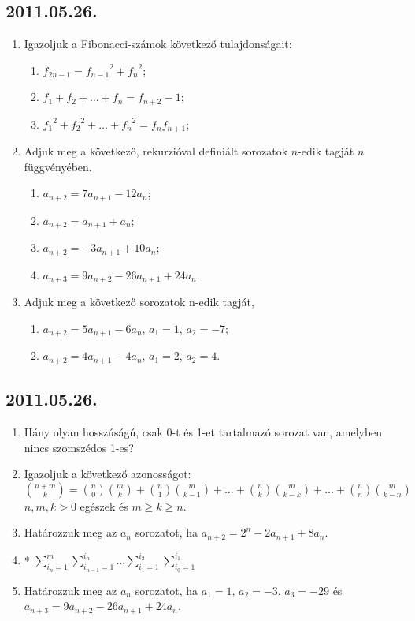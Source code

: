 \documentclass{article}
\begin{document}
\subsection*{2011.05.26.}
\begin{enumerate}
\item Igazoljuk a Fibonacci-számok következő tulajdonságait:
\begin{enumerate}
\item $f_{2n-1}={f_{n-1}}^2+{f_n}^2$;
\item $f_1+f_2+\ldots+f_n=f_{n+2}-1$;
\item ${f_1}^2+{f_2}^2+\ldots+{f_n}^2=f_nf_{n+1}$;
\end{enumerate}
\item Adjuk meg a következő, rekurzióval definiált sorozatok $n$-edik tagját $n$ függvényében.
\begin{enumerate}
\item $a_{n+2}=7a_{n+1}-12a_n$;
\item $a_{n+2}=a_{n+1}+a_n$;
\item $a_{n+2}=-3a_{n+1}+10a_n$;
\item $a_{n+3}=9a_{n+2}-26a_{n+1}+24a_n$.
\end{enumerate}
\item Adjuk meg a következő sorozatok n-edik tagját,
\begin{enumerate}
\item $a_{n+2}=5a_{n+1}-6a_n$, $a_1=1$, $a_2=-7$;
\item $a_{n+2}=4a_{n+1}-4a_n$, $a_1=2$, $a_2=4$.
\end{enumerate}
\end{enumerate}

\subsection*{2011.05.26.}
\begin{enumerate}
\item Hány olyan hosszúságú, csak 0-t és 1-et tartalmazó sorozat van, amelyben nincs szomszédos 1-es?
\item Igazoljuk a következő azonosságot:
$\binom {n+m}k=\binom n0\binom mk+\binom n1\binom m{k-1}+\ldots+\binom nk\binom m{k-k}+\ldots+\binom nn\binom m{k-n}$
$n, m, k > 0$ egészek és $m\ge k\ge n$.
\item Határozzuk meg az $a_n$ sorozatot, ha $a_{n+2}=2^n-2a_{n+1}+8a_n$.
\item* $\sum\limits_{i_n=1}^m \sum\limits_{i_{n-1}=1}^{i_n} \ldots \sum\limits_{i_1=1}^{i_2} \sum\limits_{i_0=1}^{i_1}$
\item Határozzuk meg az $a_n$ sorozatot, ha $a_1=1$, $a_2=-3$, $a_3=-29$ és $a_{n+3}=9a_{n+2}-26a_{n+1}+24a_n$.
\end{enumerate}
\end{document}
